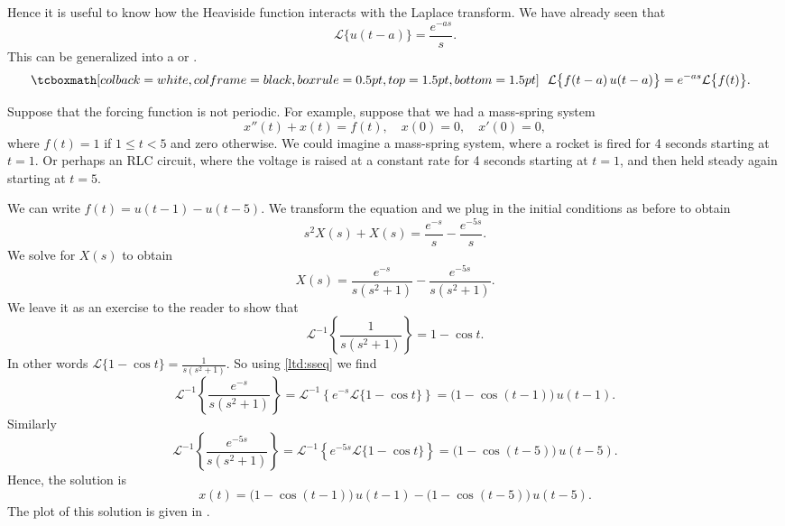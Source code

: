 Hence it is 
useful to know how the Heaviside function interacts with the Laplace
transform.  We have already seen that
\begin{equation*}
\mathcal{L} \bigl\{ u(t-a) \bigr\} = \frac{e^{-as}}{s} .
\end{equation*}
This can be generalized into a \emph{}
or \emph{}.
\begin{equation} \label{ltd:sseq}
\mybxbg{~~
\mathcal{L} \bigl\{ f(t-a) \, u(t-a) \bigr\}
= e^{-as} \mathcal{L} \bigl\{ f(t) \bigr\} .
~~}
\end{equation}

\begin{example} \label{lt:rocketex}
Suppose that the forcing function is not periodic.  For example,
suppose that we had a mass-spring system
\begin{equation*}
x''(t) + x(t) = f(t) , \quad x(0) = 0, \quad x'(0) = 0,
\end{equation*}
where $f(t) = 1$ if $1 \leq t < 5$ and zero otherwise.  We could imagine a
mass-spring system, where a rocket is fired for 4 seconds starting at
$t=1$.  Or perhaps an RLC circuit, where the voltage is raised
at a constant rate for 4 seconds starting at $t=1$, and then held steady 
again
starting at $t=5$.

We can
write $f(t) = u(t-1) - u(t-5)$.  We transform the equation and we plug in
the initial conditions as before to obtain
\begin{equation*}
s^2 X(s) + X(s) = \frac{e^{-s}}{s} - \frac{e^{-5s}}{s} .
\end{equation*}
We solve for $X(s)$ to obtain
\begin{equation*}
X(s) = \frac{e^{-s}}{s(s^2+1)} - \frac{e^{-5s}}{s(s^2+1)} .
\end{equation*}
We leave it as an exercise to the reader to show that
\begin{equation*}
{\mathcal{L}}^{-1} \left\{ \frac{1}{s(s^2+1)} \right\}
= 1 - \cos t .
\end{equation*}
In other words 
$\mathcal{L} \{ 1 - \cos t  \} = 
\frac{1}{s(s^2+1)}$.  So using \eqref{ltd:sseq} we find
\begin{equation*}
{\mathcal{L}}^{-1} \left\{ \frac{e^{-s}}{s(s^2+1)} \right\}
=
{\mathcal{L}}^{-1} \left\{
e^{-s}
\mathcal{L} \{ 1 - \cos t \}
\right\}
=
\bigl( 1 - \cos (t-1) \bigr) \, u(t-1) .
\end{equation*}
Similarly
\begin{equation*}
{\mathcal{L}}^{-1} \left\{ \frac{e^{-5s}}{s(s^2+1)} \right\}
=
{\mathcal{L}}^{-1} \left\{
e^{-5s}
\mathcal{L} \{ 1 - \cos t \}
\right\}
=
\bigl( 1 - \cos (t-5) \bigr) \, u(t-5) .
\end{equation*}
Hence, the solution is
\begin{equation*}
x(t) = 
\bigl( 1 - \cos (t-1) \bigr) \, u(t-1) -
\bigl( 1 - \cos (t-5) \bigr) \, u(t-5) .
\end{equation*}
The plot of this solution is given in .


\end{example}
